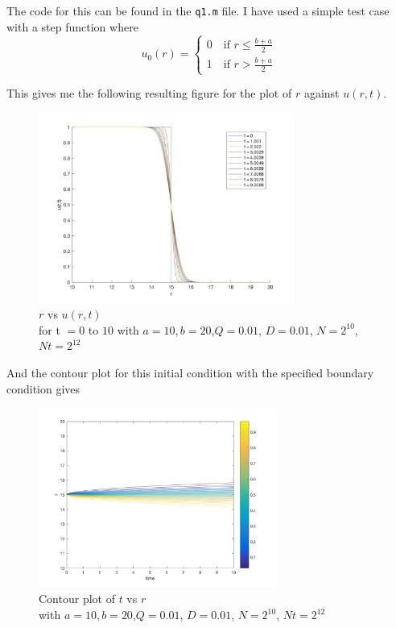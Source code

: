\documentclass{article}
\begin{document}
\begin{enumerate}
	The code for this can be found in the \texttt{q1.m} file. I have used a simple test case with a step function where
	\begin{equation*}
		u_0(r) = \begin{cases}
			0 \quad \text{if $r \leq \frac{b+a}{2}$} \\
			1 \quad \text{if $r > \frac{b+a}{2}$}
		\end{cases}
	\end{equation*}

	This gives me the following resulting figure for the plot of $r$ against $u(r,t)$. 
	
	\begin{figure}[h!]
	\centering
		\includegraphics[width = 0.75\textwidth]{fig_q1}
		\caption{ $r$ vs $u(r,t)$ \\ for t $ = 0$ to $10$ with $a=10, b=20$,$Q = 0.01$, $D = 0.01$, $N = 2^{10}$, $Nt = 2^{12}$}
	\end{figure}

	And the contour plot for this initial condition with the specified boundary condition gives 
	
	\begin{figure}[h!]
		\centering
		\includegraphics[width = 0.7\textwidth]{fig_q1contour}
		\caption{ Contour plot of $t$ vs $r$ \\ with $a=10, b=20$,$Q = 0.01$, $D = 0.01$, $N = 2^{10}$, $Nt = 2^{12}$}
	\end{figure}
	

\end{enumerate}
\end{document}
